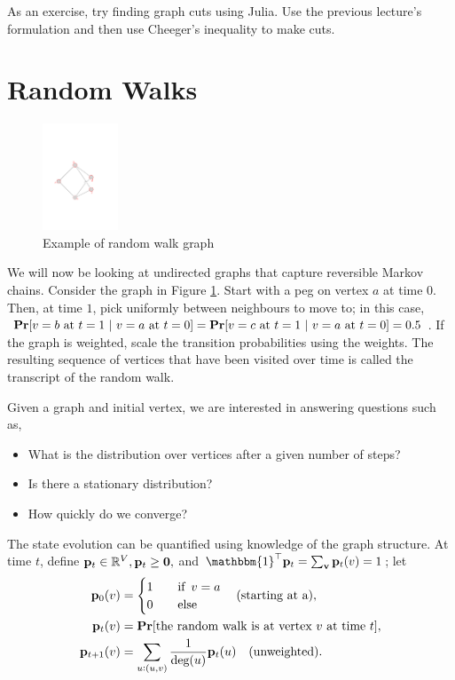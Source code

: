 \documentclass[11pt]{article}
\begin{document}
As an exercise, try finding graph cuts using Julia. Use the previous lecture's formulation and then use Cheeger's inequality to make cuts.

\newpage
\section{Random Walks}
\begin{figure}
\centering
\includegraphics[width=0.20\textwidth]{images/randomwalk}
\caption{Example of random walk graph}
\label{fig.randomwalk}
\end{figure}

We will now be looking at undirected graphs that capture reversible Markov chains. Consider the graph in Figure \ref{fig.randomwalk}. Start with a peg on vertex $a$ at time $0$. Then, at time $1$, pick uniformly between neighbours to move to; in this case, $\operatorname*{\bf Pr}[\text{$v=b$ at $t=1 \ |\ v=a$ at $t=0$}] = \operatorname*{\bf Pr}[\text{$v=c$ at $t=1 \ |\ v=a$ at $t=0$}] = 0.5$. If the graph is weighted, scale the transition probabilities using the weights. The resulting sequence of vertices that have been visited over time is called the transcript of the random walk.

Given a graph and initial vertex, we are interested in answering questions such as,
\begin{itemize}
\item What is the distribution over vertices after a given number of steps?
\item Is there a stationary distribution?
\item How quickly do we converge?
\end{itemize}

The state evolution can be quantified using knowledge of the graph structure. At time $t$, define $\V{p}_t \in \mathbb{R}^V, \V{p}_t \geq \V{0},$ and $\mathbbm{1}^{\top}\V{p}_t = \sum_\V{v}\V{p}_t(v)=1$; let
\begin{align*}
\V{p}_0(v) &= \begin{cases}1 \quad &\text{if} \,\,\, v=a\\0 &\text{else}\end{cases} \quad \text{(starting at a)}, \\
\V{p}_t(v) &= \pr[\text{the random walk is at vertex $v$ at time $t$}], \\
\V{p}_{t+1}(v) &= \sum_{u:(u,v)} \dfrac{1}{\text{deg}(u)}\V{p}_t(u) \quad \text{(unweighted)}.
\end{align*}
\end{document}
